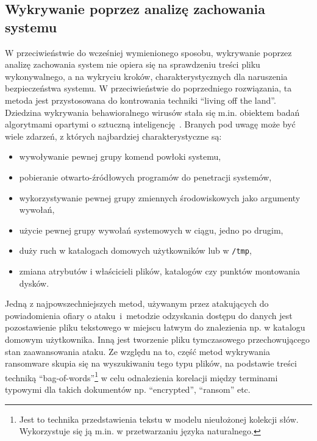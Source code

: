 \subsection{Wykrywanie poprzez analizę zachowania systemu}
\label{sec:behav}
W przeciwieństwie do wcześniej wymienionego sposobu, wykrywanie poprzez analizę zachowania system nie opiera się na sprawdzeniu treści pliku wykonywalnego, 
a na wykryciu kroków, charakterystycznych dla naruszenia bezpieczeństwa systemu. 
W przeciwieństwie do poprzedniego rozwiązania, ta metoda jest przystosowana do kontrowania techniki \foreignquote{english}{living off the land}.
Dziedzina wykrywania behawioralnego wirusów stała się m.in. obiektem badań algorytmami opartymi o sztuczną inteligencję~\cite{vehabovic_ransomware_2022}. Branych pod uwagę
może być wiele zdarzeń, z których najbardziej charakterystyczne są:
\begin{itemize}
    \item wywoływanie pewnej grupy komend powłoki systemu,
    \item pobieranie otwarto-źródłowych programów do penetracji systemów,
    \item wykorzystywanie pewnej grupy zmiennych środowiskowych jako argumenty wywołań,
    \item użycie pewnej grupy wywołań systemowych w ciągu, jedno po drugim,
    \item duży ruch w katalogach domowych użytkowników lub w \texttt{/tmp},
    \item zmiana atrybutów i właścicieli plików, katalogów czy punktów montowania dysków.
\end{itemize}
Jedną z najpowszechniejszych metod, używanym przez atakujących do powiadomienia ofiary o ataku~i~metodzie odzyskania dostępu do danych 
jest pozostawienie pliku tekstowego w miejscu łatwym do znalezienia np. w 
katalogu domowym użytkownika. Inną jest tworzenie pliku tymczasowego przechowującego 
stan zaawansowania ataku. Ze względu na to, część metod wykrywania ransomware skupia się
na wyszukiwaniu tego typu plików, na podstawie treści techniką 
\foreignquote{english}{bag-of-words}\footnote{Jest to technika przedstawienia 
tekstu w modelu nieułożonej kolekcji słów. Wykorzystuje się ją m.in. w przetwarzaniu 
języka naturalnego.} w celu odnalezienia korelacji między terminami typowymi dla 
takich dokumentów np. \foreignquote{english}{encrypted}, \foreignquote{english}{ransom}
etc.
